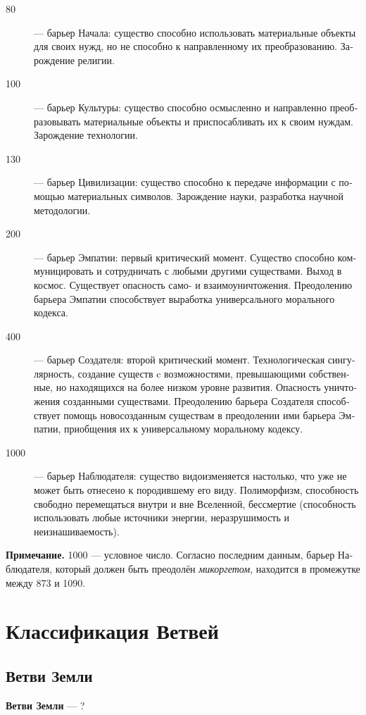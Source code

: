\documentclass[a4paper,12pt,fleqn]{book}\usepackage{polyglossia}\setdefaultlanguage[babelshorthands=true]{russian}\setotherlanguage{english}\defaultfontfeatures{Ligatures=TeX,Mapping=tex-text}\usepackage{xcolor}\newcommand{\ml}[3]{#2}
\newcommand{\theterm}[3]{\textbf{\hypertarget{#1}{#2}} --- #3}
\begin{document}
\begin{description}
\item [80] --- барьер Начала: существо способно использовать материальные объекты для своих нужд, но не способно к направленному их преобразованию.
Зарождение религии.
\item[100] --- барьер Культуры: существо способно осмысленно и направленно преобразовывать материальные объекты и приспосабливать их к своим нуждам.
Зарождение технологии.
\item[130] --- барьер Цивилизации: существо способно к передаче информации с помощью материальных символов.
Зарождение науки, разработка научной методологии.
\item[200] --- барьер Эмпатии: первый критический момент.
Существо способно коммуницировать и сотрудничать с любыми другими существами.
Выход в космос.
Существует опасность само- и взаимоуничтожения.
Преодолению барьера Эмпатии способствует выработка универсального морального кодекса.
\item[400] --- барьер Создателя: второй критический момент.
Технологическая сингулярность, создание существ c возможностями, превышающими собственные, но находящихся на более низком уровне развития.
Опасность уничтожения созданными существами.
Преодолению барьера Создателя способствует помощь новосозданным существам в преодолении ими барьера Эмпатии, приобщения их к универсальному моральному кодексу.
\item[1000] --- барьер Наблюдателя: существо видоизменяется настолько, что уже не может быть отнесено к породившему его виду.
Полиморфизм, способность свободно перемещаться внутри и вне Вселенной, бессмертие (способность использовать любые источники энергии, неразрушимость и неизнашиваемость).
\end{description}

\textbf{Примечание.}
1000 --- условное число.
Согласно последним данным, барьер Наблюдателя, который должен быть преодолён \textit{микоргетом}, находится в промежутке между 873 и 1090.

\chapter{Классификация Ветвей}

\section{Ветви Земли}

\theterm{earth-forks} %
{Ветви Земли}
{?}
\end{document}
